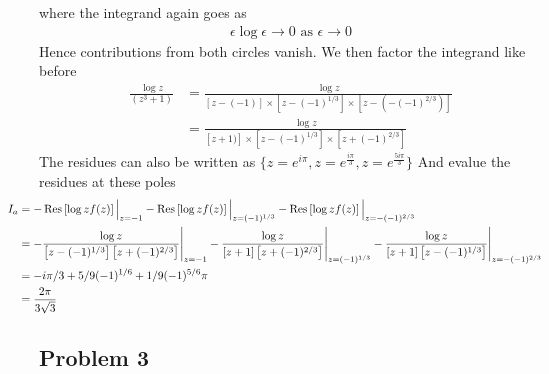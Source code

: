 \documentclass[a4paper,12pt]{article}
\begin{document}
where the integrand again goes as
\begin{equation}
	\begin{aligned}
		\epsilon\log \epsilon \to 0 \text{ as }\epsilon\to 0
	\end{aligned}
\end{equation}
Hence contributions from both circles vanish. We then factor the integrand like before
\begin{equation}
\begin{aligned}
	\frac{\log z}{(z^3+1)}&= \frac{\log z}{[z-(-1)]\times \left[z-(-1)^{1/3}\right]\times \left[z-(-(-1)^{2/3})\right]}\\
	 &=\frac{\log z}{[z+1)]\times \left[z-(-1)^{1/3}\right]\times \left[z+(-1)^{2/3}\right]}
\end{aligned}
\end{equation}
The residues can also be written as $\{z=e^{i\pi},z=e^{\frac{i \pi }{3}},z=e^{\frac{5 i \pi }{3}}\}$
And evalue the residues at these poles
\begin{equation}\hspace*{-1cm}
	\begin{aligned}
		I_a&=-\Res\left[\log z f(z)\right]\Big|_{z=-1}-\Res\left[\log zf(z)\right]\Big|_{z=(-1)^{1/3}}-\Res\left[\log zf(z)\right]\Big|_{z=-(-1)^{2/3}}\\
		&=-\frac{\log z}{\left[z-(-1)^{1/3}\right] \left[z+(-1)^{2/3}\right]}\Bigg|_{z=-1}-\frac{\log z}{[z+1] \left[z+(-1)^{2/3}\right]}\Bigg|_{z=(-1)^{1/3}}-\frac{\log z}{[z+1] \left[z-(-1)^{1/3}\right]}\Bigg|_{z=-(-1)^{2/3}}\\
		&=-i\pi/3+5/9(-1)^{1/6}+1/9(-1)^{5/6}\pi\\
		&=\frac{2 \pi }{3 \sqrt{3}}
	\end{aligned}
\end{equation}
\subsection*{Problem 3}
\end{document}
